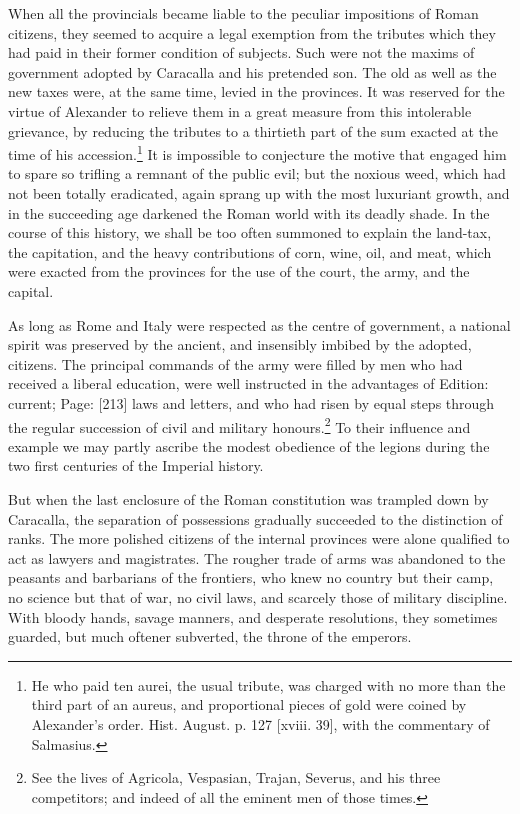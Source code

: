 When all the provincials became liable to the peculiar impositions of Roman citizens, they seemed to acquire a legal exemption from the tributes which they had paid in their former condition of subjects. Such were not the maxims of government adopted by Caracalla and his pretended son. The old as well as the new taxes were, at the same time, levied in the provinces. It was reserved for the virtue of Alexander to relieve them in a great measure from this intolerable grievance, by reducing the tributes to a thirtieth part of the sum exacted at the time of his accession.\footnote{He who paid ten aurei, the usual tribute, was charged with no more than the third part of an aureus, and proportional pieces of gold were coined by Alexander\texthebrew{}’s order. Hist. August. p. 127 [xviii. 39], with the commentary of Salmasius.} It is impossible to conjecture the motive that engaged him to spare so trifling a remnant of the public evil; but the noxious weed, which had not been totally eradicated, again sprang up with the most luxuriant growth, and in the succeeding age darkened the Roman world with its deadly shade. In the course of this history, we shall be too often summoned to explain the land-tax, the capitation, and the heavy contributions of corn, wine, oil, and meat, which were exacted from the provinces for the use of the court, the army, and the capital.

As long as Rome and Italy were respected as the centre of government, a national spirit was preserved by the ancient, and insensibly imbibed by the adopted, citizens. The principal commands of the army were filled by men who had received a liberal education, were well instructed in the advantages of Edition: current; Page: [213] laws and letters, and who had risen by equal steps through the regular succession of civil and military honours.\footnote{See the lives of Agricola, Vespasian, Trajan, Severus, and his three competitors; and indeed of all the eminent men of those times.} To their influence and example we may partly ascribe the modest obedience of the legions during the two first centuries of the Imperial history.

But when the last enclosure of the Roman constitution was trampled down by Caracalla, the separation of possessions gradually succeeded to the distinction of ranks. The more polished citizens of the internal provinces were alone qualified to act as lawyers and magistrates. The rougher trade of arms was abandoned to the peasants and barbarians of the frontiers, who knew no country but their camp, no science but that of war, no civil laws, and scarcely those of military discipline. With bloody hands, savage manners, and desperate resolutions, they sometimes guarded, but much oftener subverted, the throne of the emperors.

